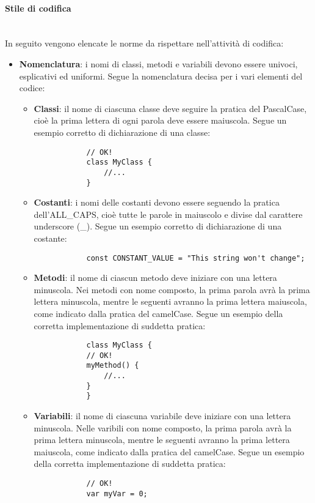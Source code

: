 			\paragraph*{Stile di codifica}\mbox{}\\ [1mm]
			In seguito vengono elencate le norme da rispettare nell'attività di codifica:
			\begin{itemize}
				\item \textbf{Nomenclatura}: i nomi di classi, metodi e variabili devono essere univoci, esplicativi ed uniformi. Segue la nomenclatura decisa per i vari elementi del codice:
				\begin{itemize}
					\item \textbf{Classi}: il nome di ciascuna classe deve seguire la pratica del PascalCase, cioè la prima lettera di ogni parola deve essere maiuscola. Segue un esempio corretto di dichiarazione di una classe:
			\begin{lstlisting}
			// OK!
			class MyClass {
				//...
			}
			\end{lstlisting} 
					\item \textbf{Costanti}: i nomi delle costanti devono essere seguendo la pratica dell'ALL\_CAPS, cioè tutte le parole in maiuscolo e divise dal carattere underscore (\_). Segue un esempio corretto di dichiarazione di una costante:
			\begin{lstlisting}
			const CONSTANT_VALUE = "This string won't change";
			\end{lstlisting}
					\item \textbf{Metodi}: il nome di ciascun metodo deve iniziare con una lettera minuscola. Nei metodi con nome composto, la prima parola avrà la prima lettera minuscola, mentre le seguenti avranno la prima lettera maiuscola, come indicato dalla pratica del camelCase. Segue un esempio della corretta implementazione di suddetta pratica:
			\begin{lstlisting}
			class MyClass {
			// OK!
			myMethod() {
				//...
			}
			}
			\end{lstlisting}
				\item \textbf{Variabili}: il nome di ciascuna variabile deve iniziare con una lettera minuscola. Nelle varibili con nome composto, la prima parola avrà la prima lettera minuscola, mentre le seguenti avranno la prima lettera maiuscola, come indicato dalla pratica del camelCase. Segue un esempio della corretta implementazione di suddetta pratica:
			\begin{lstlisting}
			// OK!
			var myVar = 0;
			\end{lstlisting}

\end{itemize}
\end{itemize}
